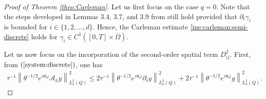 \documentclass{amsart}
\numberwithin{equation}{section}
\begin{document}
\begin{proof}[Proof of Theorem \ref{theo:Carleman}] Let us first focus on the case $q=0$. Note that the steps developed in Lemmas 3.4, 3.7, and 3.9 from \cite{BLR-2014} still hold provided that $\partial_{t}\gamma_{i}$ is bounded for $i\in\{1,2,\ldots, d\}$. Hence, the Carleman estimate \eqref{ine:carleman:semi-discrete} holds for $\gamma_{i}\in C^1([0,T]\times\overline{\Omega})$.

Let us now focus on the incorporation of the second-order spatial term $D_{ij}^{2}$. First, from $(\ref{system:discrete})$, one has 
\begin{align}\label{ine:A}
    \tau^{-1}\left\| \theta^{-1/2}e^{\tau\theta\varphi}\mathcal{A}_{h}y\right\|^{2}_{L_{h}^{2}(Q)}\leq2\tau^{-1}\left\|\theta^{-1/2}e^{\tau\theta\varphi}\partial_{t}y \right\|^{2}_{L_{h}^{2}(Q)}+2\tau^{-1}\left\|\theta^{-1/2}e^{\tau\theta\varphi}g\right\|^{2}_{L_{h}^{2}(Q)}.
\end{align}


\end{proof}
\end{document}
